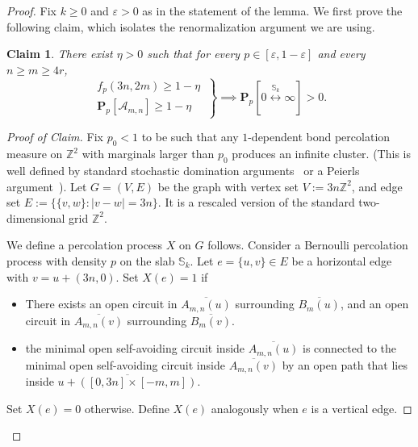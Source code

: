 \documentclass[12pt, twoside,a4paper,reqno]{amsart}
\theoremstyle{plain}
\newtheorem*{claim}{Claim}
\theoremstyle{remark}
\theoremstyle{definition}
\newcommand{\eps}{\varepsilon}
\newcommand{\Z}{\mathbb{Z}}
\newcommand{\PP}{\mathbf{P}}
\newcommand{\Pp}[1]{\PP_p \left [ #1 \right ]}
\newcommand{\ol}{\overline}
\begin{document}
\begin{proof} %
  Fix $k\ge 0$ and $\eps>0$ as in the statement of the lemma. We first prove the
  following claim, which isolates the renormalization argument we are using.
  \begin{claim}
    There exist $\eta>0$ such that for every  $p\in [\eps, 1-\eps]$  and every
    $n\ge m \ge 4r$,
    \begin{equation}
      \label{eq:74}      
      \left.
        \begin{aligned}
          f_p(3n,2m)\ge 1-\eta\\ 
          \Pp{\mathcal A_{m,n}}\ge1-\eta 
        \end{aligned}\   \right\}\implies  \mathbf{P}_p\left[ 0\overset{\mathbb{S}_{k}}{\longleftrightarrow }\infty \right] >0.
    \end{equation}
  \end{claim}
  \begin{proof}[Proof of Claim]
    Fix $p_{0}<1 $ to be such that any $1$-dependent bond percolation measure on
    $\mathbb{Z}^{2}$ with marginals larger than $p_{0}$ produces an infinite
    cluster. (This is well defined by standard stochastic domination
    arguments~\cite%
    {ligget1997domination} or a Peierls argument~\cite{balister2005continuum}).
    Let $G=(V,E)$ be the graph with vertex set $V:=3n\Z^2$, and edge set
    $E:=\{\{v,w\}:|v-w|=3n\}$. It is a rescaled version of the standard
    two-dimensional grid $\mathbb{Z}^{2}$.

    We define a percolation process $X$ on $G$ follows. Consider a Bernoulli
    percolation process with density $p$ on the slab $\mathbb S_{k}$. Let
    $e=\{u,v\}\in E$ be a horizontal edge with  $v=u+(3n,0)$. Set $X(e)=1$ if

\begin{itemize}
\item There exists an open circuit in $\ol{A_{m,n}(u)}$ surrounding
  $\ol{B_m(u)}$, and an open circuit in $\ol{A_{m,n}(v)}$ surrounding
  $\ol{B_m(v)}$.
\item the minimal open self-avoiding circuit inside $\ol{A_{m,n}(u)}$ is
  connected to the minimal open self-avoiding circuit inside $\ol{A_{m,n}(v)}$
  by an open path that lies inside $\ol{u+ ([0,3n]\times [-m,m])}$.
\end{itemize}
Set $X(e)=0$ otherwise. Define $X(e)$ analogously when $e$ is a vertical edge.


\end{proof}
\end{proof}
\end{document}
